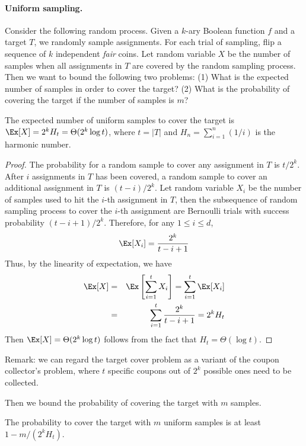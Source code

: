 \paragraph{Uniform sampling.}
Consider the following random process. Given a $k$-ary Boolean function
$f$ and a target $T$, we randomly sample assignments. For each trial of
sampling, flip a sequence of $k$ independent \emph{fair} coins. Let
random variable $X$ be the number of samples when all assignments in $T$
are covered by the random sampling process. Then we want to bound the
following two problems: (1) What is the expected number of samples in
order to cover the target? (2) What is the probability of covering the
target if the number of samples is $m$?

\begin{lemma}
\label{LEMMA:uniform-expectation}
The expected number of uniform samples to cover the target is $\Ex[X] =
2^k H_{t} = \Theta(2^k \log{t})$, where $t = |T|$ and $H_{n} =
\sum_{i=1}^n (1/i)$ is the harmonic number.
\end{lemma}

\begin{proof}
The probability for a random sample to cover any assignment in $T$ is
$t/2^k$. After $i$ assignments in $T$ has been covered, a random sample
to cover an additional assignment in $T$ is $(t-i)/2^k$. Let random
variable $X_i$ be the number of samples used to hit the $i$-th
assignment in $T$, then the subsequence of random sampling process to
cover the $i$-th assignment are Bernoulli trials with success
probability $(t-i+1)/2^k$. Therefore, for any $1\le i\le d$,
\[
  \Ex[X_i] = \frac{2^k}{t-i+1}
\]
Thus, by the linearity of expectation, we have
\begin{eqnarray*}
  \Ex[X] &=& \Ex\left[\sum_{i=1}^t X_i\right] = \sum_{i=1}^t \Ex[X_i]\\
  &=& \sum_{i=1}^t \frac{2^k}{t-i+1} = 2^k H_t
\end{eqnarray*}
Then $\Ex[X] = \Theta(2^k \log{t})$ follows from the fact that $H_{t} =
\Theta(\log{t})$.
\end{proof}
Remark: we can regard the target cover problem as a variant of the
coupon collector's problem, where $t$ specific coupons out of $2^k$
possible ones need to be collected.

Then we bound the probability of covering the target with $m$ samples.
\begin{lemma}
\label{LEMMA:uniform-prob}
The probability to cover the target with $m$ uniform samples is at least
$1 - m / (2^k H_t)$.
\end{lemma}


